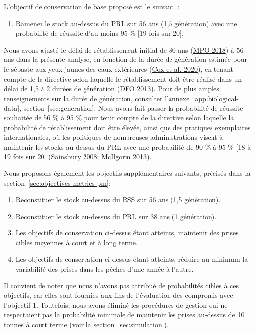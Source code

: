 \documentclass[french,11pt]{book}
\begin{document}
L'objectif de conservation de base proposé est le suivant~:
\begin{enumerate}
\def\labelenumi{\arabic{enumi}.}

\item
  Ramener le stock au-dessus du PRL sur 56 ans (1,5 génération) avec une probabilité de réussite d'au moins 95 \% {[}19 fois sur 20{]}.
\end{enumerate}
Nous avons ajusté le délai de rétablissement initial de 80 ans (\protect\hyperlink{ref-ifmp2018}{MPO 2018}) à 56 ans dans la présente analyse, en fonction de la durée de génération estimée pour le sébaste aux yeux jaunes des eaux extérieures (\protect\hyperlink{ref-cox2020}{Cox et al. 2020}), en tenant compte de la directive selon laquelle le rétablissement doit être réalisé dans un délai de 1,5 à 2 durées de génération (\protect\hyperlink{ref-dfo2013}{DFO 2013}). Pour de plus amples renseignements sur la durée de génération, consulter l'annexe~\ref{app:biological-data}, section~\ref{sec:generation}. Nous avons fait passer la probabilité de réussite souhaitée de 56 \% à 95 \% pour tenir compte de la directive selon laquelle la probabilité de rétablissement doit être élevée, ainsi que des pratiques exemplaires internationales, où les politiques de nombreuses administrations visent à maintenir les stocks au-dessus du PRL avec une probabilité de 90 \% à 95 \% {[}18 à 19 fois sur 20{]} (\protect\hyperlink{ref-sainsbury2008}{Sainsbury 2008}; \protect\hyperlink{ref-mcilgorm2013}{McIlgorm 2013}).

Nous proposons également les objectifs supplémentaires suivants, précisés dans la section~\ref{sec:objectives-metrics-pm}:
\begin{enumerate}
\def\labelenumi{\arabic{enumi}.}
\setcounter{enumi}{1}
\item
  Reconstituer le stock au-dessus du RSS sur 56 ans (1,5 génération).
\item
  Reconstituer le stock au-dessus du PRL sur 38 ans (1 génération).
\item
  Les objectifs de conservation ci-dessus étant atteints, maintenir des prises cibles moyennes à court et à long terme.
\item
  Les objectifs de conservation ci-dessus étant atteints, réduire au minimum la variabilité des prises dans les pêches d'une année à l'autre.
\end{enumerate}
Il convient de noter que nous n'avons pas attribué de probabilités cibles à ces objectifs, car elles sont fournies aux fins de l'évaluation des compromis avec l'objectif 1. Toutefois, nous avons éliminé les procédures de gestion qui ne respectaient pas la probabilité minimale de maintenir les prises au-dessus de 10 tonnes à court terme (voir la section~\ref{sec:simulation}).
\end{document}
